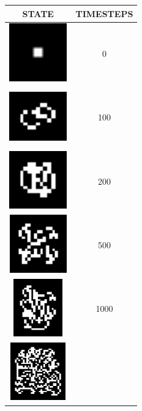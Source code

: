 \begin{table}[!ht]
	\begin{center}
		\begin{tabular}{ | c | c | }
			\hline
			STATE & TIMESTEPS \\ \hline
			\includegraphics[width=25mm, height=25mm]{question_4/Iteration-0.eps} & 
				0 \\ \hline
			\includegraphics[width=25mm, height=25mm]{question_4/Iteration-100.eps} &
				100 \\ \hline
			\includegraphics[width=25mm, height=25mm]{question_4/Iteration-200.eps} &
				200 \\ \hline
			\includegraphics[width=25mm, height=25mm]{question_4/Iteration-500.eps} &
				500 \\ \hline
			\includegraphics[width=25mm, height=25mm]{question_4/Iteration-1000.eps} &
				1000 \\ \hline
			\includegraphics[width=25mm, height=25mm]{question_4/Iteration-5000.eps} &

\end{tabular}
\end{center}
\end{table}
